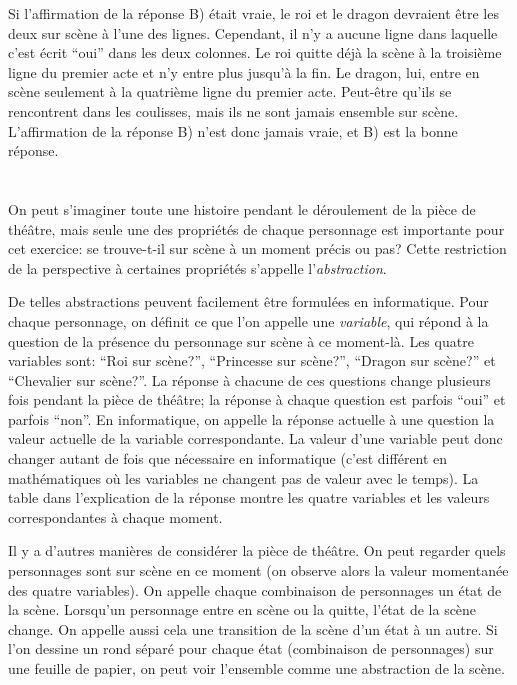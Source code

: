 {{Si l’affirmation de la réponse B) était vraie, le roi et le dragon devraient être les deux sur scène à l’une des lignes. Cependant, il n’y a aucune ligne dans laquelle c’est écrit “oui” dans les deux colonnes. Le roi quitte déjà la scène à la troisième ligne du premier acte et n’y entre plus jusqu’à la fin. Le dragon, lui, entre en scène seulement à la quatrième ligne du premier acte. Peut-être qu’ils se rencontrent dans les coulisses, mais ils ne sont jamais ensemble sur scène. L’affirmation de la réponse B) n’est donc jamais vraie, et B) est la bonne réponse.



\section*{\BrochureItsInformatics}
On peut s’imaginer toute une histoire pendant le déroulement de la pièce de théâtre, mais seule une des propriétés de chaque personnage est importante pour cet exercice: se trouve-t-il sur scène à un moment précis ou pas? Cette restriction de la perspective à certaines propriétés s’appelle l’\emph{abstraction}.

De telles abstractions peuvent facilement être formulées en informatique. Pour chaque personnage, on définit ce que l’on appelle une \emph{variable}, qui répond à la question de la présence du personnage sur scène à ce moment-là. Les quatre variables sont: “Roi sur scène?”, “Princesse sur scène?”, “Dragon sur scène?” et “Chevalier sur scène?”. La réponse à chacune de ces questions change plusieurs fois pendant la pièce de théâtre; la réponse à chaque question est parfois “oui” et parfois “non”. En informatique, on appelle la réponse actuelle à une question la valeur actuelle de la variable correspondante. La valeur d’une variable peut donc changer autant de fois que nécessaire en informatique (c’est différent en mathématiques où les variables ne changent pas de valeur avec le temps). La table dans l’explication de la réponse montre les quatre variables et les valeurs correspondantes à chaque moment.

Il y a d’autres manières de considérer la pièce de théâtre. On peut regarder quels personnages sont sur scène en ce moment (on observe alors la valeur momentanée des quatre variables). On appelle chaque combinaison de personnages un état de la scène. Lorsqu’un personnage entre en scène ou la quitte, l’état de la scène change. On appelle aussi cela une transition de la scène d’un état à un autre. Si l’on dessine un rond séparé pour chaque état (combinaison de personnages) sur une feuille de papier, on peut voir l’ensemble comme une abstraction de la scène.

}}
